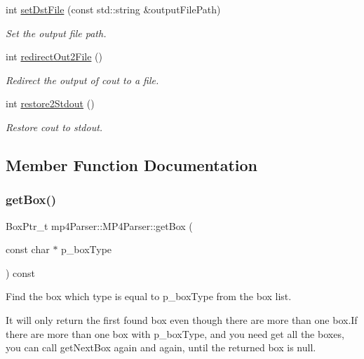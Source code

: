 \begin{DoxyCompactItemize}
int \mbox{\hyperlink{classmp4_parser_1_1_m_p4_parser_ac5ac99898f7161ebcf828c6f8be2f32a}{set\+Dst\+File}} (const std\+::string \&output\+File\+Path)
\begin{DoxyCompactList}\small\item\em Set the output file path. \end{DoxyCompactList}\item 
int \mbox{\hyperlink{classmp4_parser_1_1_m_p4_parser_a29f0fc9e2e0c7ed4751e44b8f28092c3}{redirect\+Out2\+File}} ()
\begin{DoxyCompactList}\small\item\em Redirect the output of cout to a file. \end{DoxyCompactList}\item 
int \mbox{\hyperlink{classmp4_parser_1_1_m_p4_parser_a7270d8138d1e9c6db3ed4838e5f34ee6}{restore2\+Stdout}} ()
\begin{DoxyCompactList}\small\item\em Restore cout to stdout. \end{DoxyCompactList}\end{DoxyCompactItemize}


\subsection{Member Function Documentation}
\mbox{\label{classmp4_parser_1_1_m_p4_parser_a01d96e45863265af62744aa0176ba13f}} 
\subsubsection{\texorpdfstring{getBox()}{getBox()}}
{\footnotesize\ttfamily Box\+Ptr\+\_\+t mp4\+Parser\+::\+M\+P4\+Parser\+::get\+Box (\begin{DoxyParamCaption}\item[{const char $\ast$}]{p\+\_\+box\+Type }\end{DoxyParamCaption}) const}



Find the box which type is equal to p\+\_\+box\+Type from the box list. 

It will only return the first found box even though there are more than one box.\+If there are more than one box with p\+\_\+box\+Type, and you need get all the boxes, you can call get\+Next\+Box again and again, until the returned box is null. \mbox{\label{classmp4_parser_1_1_m_p4_parser_aded5fb465d00d6a7cdde6fa276615c49}} 
